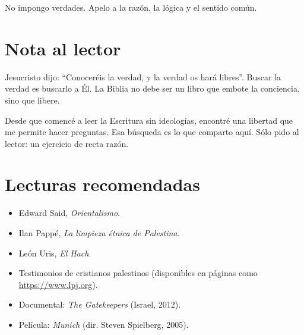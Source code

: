 \documentclass[12pt]{article}
\begin{document}
No impongo verdades. Apelo a la razón, la lógica y el sentido común.

\section*{Nota al lector}

Jesucristo dijo: ``Conoceréis la verdad, y la verdad os hará libres''. Buscar la verdad es buscarlo a Él. La Biblia no debe ser un libro que embote la conciencia, sino que libere.

Desde que comencé a leer la Escritura sin ideologías, encontré una libertad que me permite hacer preguntas. Esa búsqueda es lo que comparto aquí. Sólo pido al lector: un ejercicio de recta razón.

\section*{Lecturas recomendadas}

\begin{itemize}
    \item Edward Said, \textit{Orientalismo}.
    \item Ilan Pappé, \textit{La limpieza étnica de Palestina}.
    \item León Uris, \textit{El Hach}.
    \item Testimonios de cristianos palestinos (disponibles en páginas como \url{https://www.lpj.org}).
    \item Documental: \textit{The Gatekeepers} (Israel, 2012).
    \item Película: \textit{Munich} (dir. Steven Spielberg, 2005).
\end{itemize}
\end{document}
